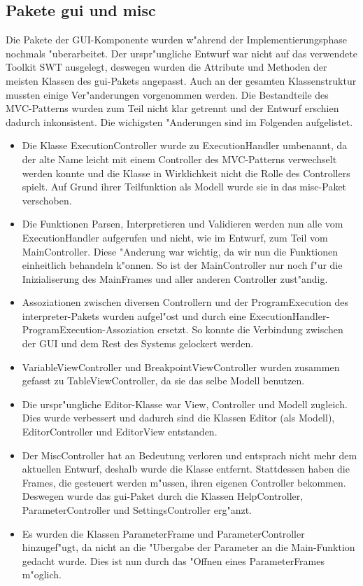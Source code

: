 \subsection{Pakete gui und misc}
Die Pakete der GUI-Komponente wurden w"ahrend der Implementierungsphase nochmals "uberarbeitet. Der urspr"ungliche Entwurf war nicht auf das verwendete Toolkit SWT ausgelegt, deswegen wurden die Attribute und Methoden der meisten Klassen des gui-Pakets angepasst. Auch an der gesamten Klassenstruktur mussten einige Ver"anderungen vorgenommen werden. Die Bestandteile des MVC-Patterns wurden zum Teil nicht klar getrennt und der Entwurf erschien dadurch inkonsistent. Die wichigsten "Anderungen sind im Folgenden aufgelistet. 
\begin{itemize}
\item Die Klasse ExecutionController wurde zu ExecutionHandler umbenannt, da der alte Name leicht mit einem Controller des MVC-Patterns verwechselt werden konnte und die Klasse in Wirklichkeit nicht die Rolle des Controllers spielt. Auf Grund ihrer Teilfunktion als Modell wurde sie in das misc-Paket verschoben.
\item Die Funktionen Parsen, Interpretieren und Validieren werden nun alle vom ExecutionHandler aufgerufen und nicht, wie im Entwurf, zum Teil vom MainController. Diese "Anderung war wichtig, da wir nun die Funktionen einheitlich behandeln k"onnen. So ist der MainController nur noch f"ur die Inizialiserung des MainFrames und aller anderen Controller zust"andig. 
\item Assoziationen zwischen diversen Controllern und der ProgramExecution des interpreter-Pakets wurden aufgel"ost und durch eine ExecutionHandler-ProgramExecution-Assoziation ersetzt. So konnte die Verbindung zwischen der GUI und dem Rest des Systems gelockert werden.
\item VariableViewController und BreakpointViewController wurden zusammen gefasst zu TableViewController, da sie das selbe Modell benutzen. 
\item Die urspr"ungliche Editor-Klasse war View, Controller und Modell zugleich. Dies wurde verbessert und dadurch sind die Klassen Editor (als Modell), EditorController und EditorView entstanden.
\item Der MiscController hat an Bedeutung verloren und entsprach nicht mehr dem aktuellen Entwurf, deshalb wurde die Klasse entfernt. Stattdessen haben die Frames, die gesteuert werden m"ussen, ihren eigenen Controller bekommen. Deswegen wurde das gui-Paket durch die Klassen HelpController, ParameterController und SettingsController erg"anzt.
\item Es wurden die Klassen ParameterFrame und ParameterController hinzugef"ugt, da nicht an die "Ubergabe der Parameter an die Main-Funktion gedacht wurde. Dies ist nun durch das "Offnen eines ParameterFrames m"oglich.
\end{itemize}